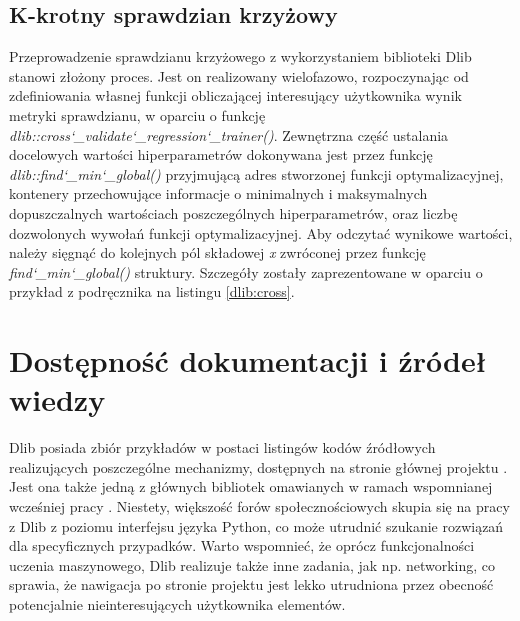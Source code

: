 
\subsection{K-krotny sprawdzian krzyżowy}

Przeprowadzenie sprawdzianu krzyżowego z wykorzystaniem biblioteki Dlib stanowi złożony proces. Jest on realizowany wielofazowo, rozpoczynając od zdefiniowania własnej funkcji obliczającej interesujący użytkownika wynik metryki sprawdzianu, w oparciu o funkcję \textit{dlib::cross\char`_validate\char`_regression\char`_trainer()}. Zewnętrzna część ustalania docelowych wartości hiperparametrów dokonywana jest przez funkcję \textit{dlib::find\char`_min\char`_global()} przyjmującą adres stworzonej funkcji optymalizacyjnej, kontenery przechowujące informacje o minimalnych i maksymalnych dopuszczalnych wartościach poszczególnych hiperparametrów, oraz liczbę dozwolonych wywołań funkcji optymalizacyjnej. Aby odczytać wynikowe wartości, należy sięgnąć do kolejnych pól składowej \textit{x} zwróconej przez funkcję \textit{find\char`_min\char`_global()} struktury. Szczegóły zostały zaprezentowane w oparciu o przykład z podręcznika \cite{handsOnMachineLearning} na listingu \ref{dlib:cross}.


\section{Dostępność dokumentacji i źródeł wiedzy}

Dlib posiada zbiór przykładów w postaci listingów kodów źródłowych realizujących poszczególne mechanizmy, dostępnych na stronie głównej projektu \cite{dlib:home}. Jest ona także jedną z głównych bibliotek omawianych w ramach wspomnianej wcześniej pracy \cite{handsOnMachineLearning}. Niestety, większość forów społecznościowych skupia się na pracy z Dlib z poziomu interfejsu języka Python, co może utrudnić szukanie rozwiązań dla specyficznych przypadków. Warto wspomnieć, że oprócz funkcjonalności uczenia maszynowego, Dlib realizuje także inne zadania, jak np. networking, co sprawia, że nawigacja po stronie projektu jest lekko utrudniona przez obecność potencjalnie nieinteresujących użytkownika elementów.